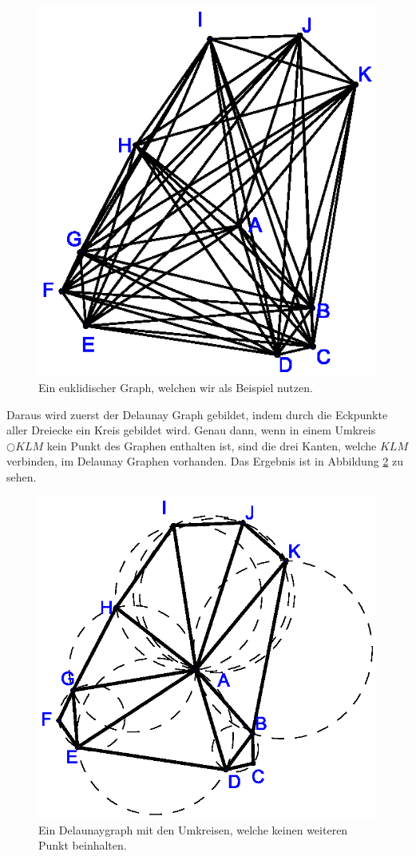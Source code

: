 \documentclass[a4paper,twoside]{IEEEtran}
\begin{document}
\begin{figure}[h!]
\centering
\includegraphics[width=0.6\linewidth]{beispielgraph.eps}
\caption{Ein euklidischer Graph, welchen wir als Beispiel nutzen.}
\label{fig:beispielgraph}
\end{figure}

Daraus wird zuerst der Delaunay Graph gebildet, indem durch die Eckpunkte aller Dreiecke ein Kreis gebildet wird.
Genau dann, wenn in einem Umkreis $\bigcirc{KLM} $ kein Punkt des Graphen enthalten ist, sind die drei Kanten, welche $KLM $ verbinden, im Delaunay Graphen vorhanden.
Das Ergebnis ist in Abbildung \ref{fig:delaunay} zu sehen.

\begin{figure}[h!]
\centering
\includegraphics[width=0.7\linewidth]{Delaunay_Graph.eps}
\caption{Ein Delaunaygraph mit den Umkreisen, welche keinen weiteren Punkt beinhalten.}
\label{fig:delaunay}
\end{figure}
\end{document}
